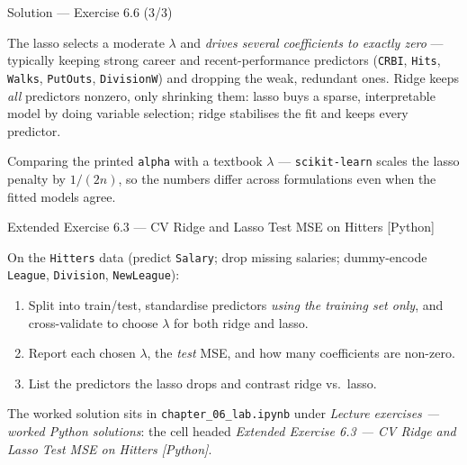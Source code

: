 \documentclass[aspectratio=169,11pt]{beamer}
\begin{document}
\begin{frame}{Solution --- Exercise 6.6 (3/3)}
  \begin{solutionbox}
    The lasso selects a moderate $\lambda$ and \emph{drives several
    coefficients to exactly zero} --- typically keeping strong career and
    recent-performance predictors (\texttt{CRBI}, \texttt{Hits},
    \texttt{Walks}, \texttt{PutOuts}, \texttt{DivisionW}) and dropping the
    weak, redundant ones. Ridge keeps \emph{all} predictors nonzero, only
    shrinking them: lasso buys a sparse, interpretable model by doing
    variable selection; ridge stabilises the fit and keeps every predictor.
  \end{solutionbox}
  \begin{mistake}
    Comparing the printed \texttt{alpha} with a textbook $\lambda$ ---
    \texttt{scikit-learn} scales the lasso penalty by $1/(2n)$, so the
    numbers differ across formulations even when the fitted models agree.
  \end{mistake}
\end{frame}


\begin{frame}[fragile]{Extended Exercise 6.3 --- CV Ridge and Lasso Test MSE on Hitters [Python]}
  \begin{longexercise}
    On the \texttt{Hitters} data (predict \texttt{Salary}; drop missing
    salaries; dummy-encode \texttt{League}, \texttt{Division},
    \texttt{NewLeague}):
    \begin{enumerate}
      \item Split into train/test, standardise predictors \emph{using the
            training set only}, and cross-validate to choose $\lambda$ for
            both ridge and lasso.
      \item Report each chosen $\lambda$, the \emph{test} MSE, and how
            many coefficients are non-zero.
      \item List the predictors the lasso drops and contrast ridge vs.\
            lasso.
    \end{enumerate}
  \end{longexercise}
  \begin{labnote}
    The worked solution sits in \texttt{chapter\_06\_lab.ipynb} under
    \emph{Lecture exercises --- worked Python solutions}: the cell headed
    \emph{Extended Exercise 6.3 --- CV Ridge and Lasso Test MSE on Hitters [Python]}.
  \end{labnote}
\end{frame}
\end{document}
